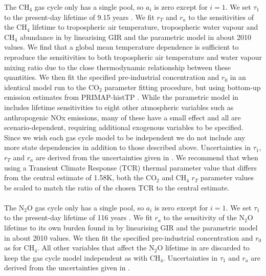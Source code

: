 \documentclass[gmd, manuscript]{copernicus}
\begin{document}
The CH$_4$ gas cycle only has a single pool, so $a_i$ is zero except for $i=1$. We set $\tau_1$ to the present-day lifetime of 9.15 years \citep{Holmes2013}. We fit $r_T$ and $r_a$ to the sensitivities of the CH$_4$ lifetime to tropospheric air temperature, tropospheric water vapour and CH$_4$ abundance in \cite{Holmes2013} by linearising GIR and the parametric model in \citeauthor{Holmes2013} about 2010 values. We find that a global mean temperature dependence is sufficient to reproduce the sensitivities to both tropospheric air temperature and water vapour mixing ratio due to the close thermodynamic relationship between these quantities. We then fit the specified pre-industrial concentration and $r_0$ in an identical model run to the CO$_2$ parameter fitting procedure, but using bottom-up emission estimates from PRIMAP-histTP \citep{Gutschow2016}. While the parametric model in \citeauthor{Holmes2013} includes lifetime sensitivities to eight other atmospheric variables such as anthropogenic NOx emissions, many of these have a small effect and all are scenario-dependent, requiring additional exogenous variables to be specified. Since we wish each gas cycle model to be independent we do not include any more state dependencies in addition to those described above. Uncertainties in $\tau_1$, $r_T$ and $r_a$ are derived from the uncertainties given in \cite{Holmes2013}. We recommend that when using a Transient Climate Response (TCR) thermal parameter value that differs from the central estimate of 1.58K, both the CO$_2$ and CH$_4$ $r_T$ parameter values be scaled to match the ratio of the chosen TCR to the central estimate.\\\\
The N$_2$O gas cycle only has a single pool, so $a_i$ is zero except for $i=1$. We set $\tau_1$ to the present-day lifetime of 116 years \citep{Prather2015}. We fit $r_a$ to the sensitivity of the N$_2$O lifetime to its own burden found in \cite{Prather2015} by linearising GIR and the parametric model in \citeauthor{Prather2015} about 2010 values. We then fit the specified pre-industrial concentration and $r_0$ as for CH$_4$. All other variables that affect the N$_2$O lifetime in \citeauthor{Prather2015} are discarded to keep the gas cycle model independent as with CH$_4$. Uncertainties in $\tau_1$ and $r_a$ are derived from the uncertainties given in \cite{Prather2015}.\\\\
\end{document}
